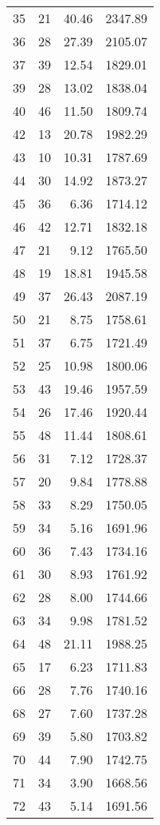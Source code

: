 \begin{appendix}
\begin{compacttable}
\begin{longtable}{@{}rrrr@{}}
35 & 21 & 40.46 & 2347.89 \\
36 & 28 & 27.39 & 2105.07 \\
37 & 39 & 12.54 & 1829.01 \\
39 & 28 & 13.02 & 1838.04 \\
40 & 46 & 11.50 & 1809.74 \\
42 & 13 & 20.78 & 1982.29 \\
43 & 10 & 10.31 & 1787.69 \\
44 & 30 & 14.92 & 1873.27 \\
45 & 36 & 6.36 & 1714.12 \\
46 & 42 & 12.71 & 1832.18 \\
47 & 21 & 9.12 & 1765.50 \\
48 & 19 & 18.81 & 1945.58 \\
49 & 37 & 26.43 & 2087.19 \\
50 & 21 & 8.75 & 1758.61 \\
51 & 37 & 6.75 & 1721.49 \\
52 & 25 & 10.98 & 1800.06 \\
53 & 43 & 19.46 & 1957.59 \\
54 & 26 & 17.46 & 1920.44 \\
55 & 48 & 11.44 & 1808.61 \\
56 & 31 & 7.12 & 1728.37 \\
57 & 20 & 9.84 & 1778.88 \\
58 & 33 & 8.29 & 1750.05 \\
59 & 34 & 5.16 & 1691.96 \\
60 & 36 & 7.43 & 1734.16 \\
61 & 30 & 8.93 & 1761.92 \\
62 & 28 & 8.00 & 1744.66 \\
63 & 34 & 9.98 & 1781.52 \\
64 & 48 & 21.11 & 1988.25 \\
65 & 17 & 6.23 & 1711.83 \\
66 & 28 & 7.76 & 1740.16 \\
68 & 27 & 7.60 & 1737.28 \\
69 & 39 & 5.80 & 1703.82 \\
70 & 44 & 7.90 & 1742.75 \\
71 & 34 & 3.90 & 1668.56 \\
72 & 43 & 5.14 & 1691.56 \\
\end{longtable}
\end{compacttable}


\end{appendix}
